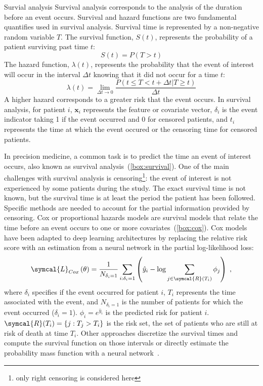 \documentclass[../main.tex]{subfiles}
\begin{document}
		\begin{mybox}[label={box:survival}]{Survial analysis}
			Survival analysis corresponds to the analysis of the duration before an event occurs.
			Survival and hazard functions are two fundamental quantifies used in survival analysis.
			Survival time is represented by a non-negative random variable \(T\).
			The survival function, \(S(t)\), represents the probability of a patient surviving past time \(t\):
			\[S(t) = P(T > t)\]
			The hazard function, \(\lambda(t)\), represents the probability that the event of interest will occur in the interval \(\Delta t\) knowing that it did not occur for a time \(t\):
			\[\lambda(t) = \lim_{\Delta t \to 0} \frac{P(t \leq T < t + \Delta t | T \geq t)}{\Delta t}\]
			A higher hazard corresponds to a greater risk that the event occurs.
			In survival analysis, for patient \(i\), \(\symbf{x}_{i}\) represents the feature or covariate vector, \(\delta_{i}\) is the event indicator taking 1 if the event occurred and 0 for censored patients, and \(t_{i}\) represents the time at which the event occured or the censoring time for censored patients.
		\end{mybox}

		In precision medicine, a common task is to predict the time an event of interest occurs, also known as survival analysis~(\cref{box:survival}).
		One of the main challenges with survival analysis is censoring\footnote{only right censoring is considered here}: the event of interest is not experienced by some patients during the study.
		The exact survival time is not known, but the survival time is at least the period the patient has been followed.
		Specific methods are needed to account for the partial information provided by censoring.
		Cox or proportional hazards models are survival models that relate the time before an event occurs to one or more covariates~(\cref{box:cox}).
		Cox models have been adapted to deep learning architectures by replacing the relative risk score with an estimation from a neural network in the partial log-likelihood loss:
		\begin{equation}
			\symcal{L}_{Cox}\left(\theta\right) = \frac{1}{N_{\delta_i = 1}} \sum_{i:\delta_i=1} \left(\hat{y}_i - \log \sum_{j \in \symcal{R}(T_i)}\phi_j \right)\; \text{,} \label{eq:cox_loss}
		\end{equation}
		where \(\delta_i\) specifies if the event occurred for patient \(i\), \(T_i\) represents the time associated with the event, and \(N_{\delta_i = 1}\) is the number of patients for which the event occurred (\(\delta_i = 1\)).
		\(\phi_i = e^{\hat{y}_i}\) is the predicted risk for patient \(i\).
		\(\symcal{R}(T_i) = \{j: T_j > T_i\}\) is the risk set, the set of patients who are still at risk of death at time \(T_i\).
		Other approaches discretize the survival times and compute the survival function on those intervals or directly estimate the probability mass function with a neural network~\cite{Lee2018}.
\end{document}
